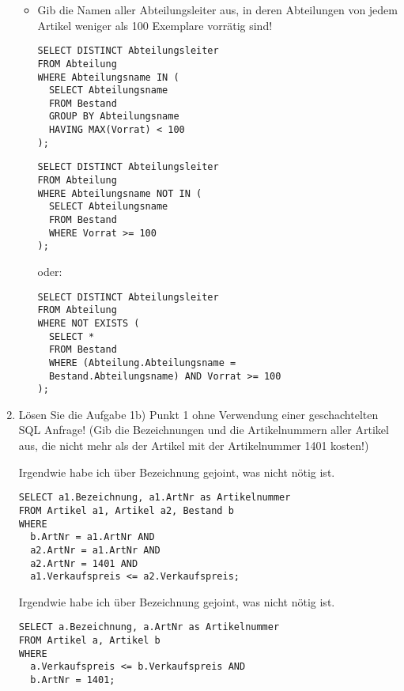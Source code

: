 \documentclass{lehramt-informatik}
\begin{document}
\begin{enumerate}
\begin{itemize}

\item Gib die Namen aller Abteilungsleiter aus, in deren Abteilungen von
jedem Artikel weniger als 100 Exemplare vorrätig sind!

\begin{antwort}[richtig]
\begin{verbatim}
SELECT DISTINCT Abteilungsleiter
FROM Abteilung
WHERE Abteilungsname IN (
  SELECT Abteilungsname
  FROM Bestand
  GROUP BY Abteilungsname
  HAVING MAX(Vorrat) < 100
);
\end{verbatim}
\end{antwort}

\begin{antwort}[richtig]
\begin{verbatim}
SELECT DISTINCT Abteilungsleiter
FROM Abteilung
WHERE Abteilungsname NOT IN (
  SELECT Abteilungsname
  FROM Bestand
  WHERE Vorrat >= 100
);
\end{verbatim}
\end{antwort}

oder:

\begin{antwort}[muster]
\begin{verbatim}
SELECT DISTINCT Abteilungsleiter
FROM Abteilung
WHERE NOT EXISTS (
  SELECT *
  FROM Bestand
  WHERE (Abteilung.Abteilungsname =
  Bestand.Abteilungsname) AND Vorrat >= 100
);
\end{verbatim}
\end{antwort}
\end{itemize}


\item Lösen Sie die Aufgabe 1b) Punkt 1 ohne Verwendung einer
geschachtelten SQL Anfrage! (Gib die Bezeichnungen und die
Artikelnummern aller Artikel aus, die nicht mehr als der Artikel mit der
Artikelnummer 1401 kosten!)
\begin{antwort}[falsch]
Irgendwie habe ich über Bezeichnung gejoint, was nicht nötig ist.
\begin{verbatim}
SELECT a1.Bezeichnung, a1.ArtNr as Artikelnummer
FROM Artikel a1, Artikel a2, Bestand b
WHERE
  b.ArtNr = a1.ArtNr AND
  a2.ArtNr = a1.ArtNr AND
  a2.ArtNr = 1401 AND
  a1.Verkaufspreis <= a2.Verkaufspreis;
\end{verbatim}
\end{antwort}

\begin{antwort}[muster]
Irgendwie habe ich über Bezeichnung gejoint, was nicht nötig ist.
\begin{verbatim}
SELECT a.Bezeichnung, a.ArtNr as Artikelnummer
FROM Artikel a, Artikel b
WHERE
  a.Verkaufspreis <= b.Verkaufspreis AND
  b.ArtNr = 1401;
\end{verbatim}
\end{antwort}


\end{enumerate}
\end{document}
